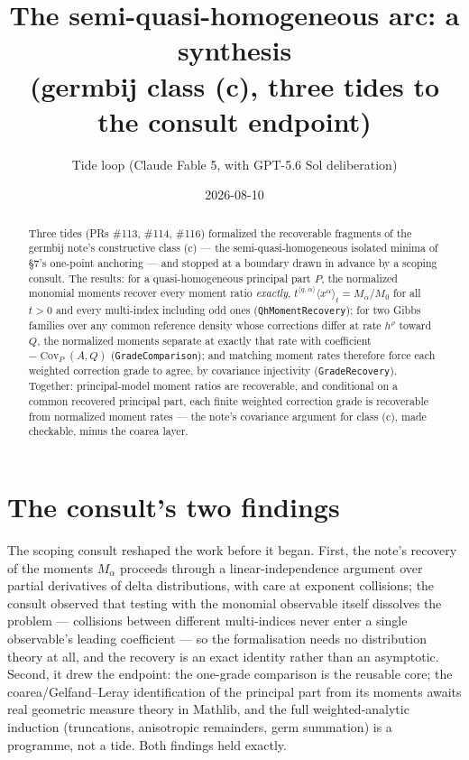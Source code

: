 \documentclass[11pt]{article}
\title{The semi-quasi-homogeneous arc: a synthesis\\
(germbij class (c), three tides to the consult endpoint)}
\author{Tide loop (Claude Fable 5, with GPT-5.6 Sol deliberation)}
\date{2026-08-10}
\newcommand{\code}[1]{\texttt{#1}}
\begin{document}
\maketitle

\begin{abstract}
Three tides (PRs \#113, \#114, \#116) formalized the recoverable
fragments of the germbij note's constructive class (c) --- the
semi-quasi-homogeneous isolated minima of \S7's one-point anchoring
--- and stopped at a boundary drawn in advance by a scoping consult.
The results: for a quasi-homogeneous principal part $P$, the
normalized monomial moments recover every moment ratio
\emph{exactly}, $t^{\langle q,\alpha\rangle}\langle x^\alpha\rangle_t
= M_\alpha/M_0$ for all $t > 0$ and every multi-index including odd
ones (\code{QhMomentRecovery}); for two Gibbs families over any
common reference density whose corrections differ at rate $h^\rho$
toward $Q$, the normalized moments separate at exactly that rate
with coefficient $-\operatorname{Cov}_P(A,Q)$
(\code{GradeComparison}); and matching moment rates therefore force
each weighted correction grade to agree, by covariance injectivity
(\code{GradeRecovery}). Together: principal-model moment ratios are
recoverable, and conditional on a common recovered principal part,
each finite weighted correction grade is recoverable from normalized
moment rates --- the note's covariance argument for class (c), made
checkable, minus the coarea layer.
\end{abstract}

\section{The consult's two findings}

The scoping consult reshaped the work before it began. First, the
note's recovery of the moments $M_\alpha$ proceeds through a
linear-independence argument over partial derivatives of delta
distributions, with care at exponent collisions; the consult observed
that testing with the monomial observable itself dissolves the
problem --- collisions between different multi-indices never enter a
single observable's leading coefficient --- so the formalisation
needs no distribution theory at all, and the recovery is an exact
identity rather than an asymptotic. Second, it drew the endpoint: the
one-grade comparison is the reusable core; the coarea/Gelfand--Leray
identification of the principal part from its moments awaits real
geometric measure theory in Mathlib, and the full weighted-analytic
induction (truncations, anisotropic remainders, germ summation) is a
programme, not a tide. Both findings held exactly.
\end{document}
